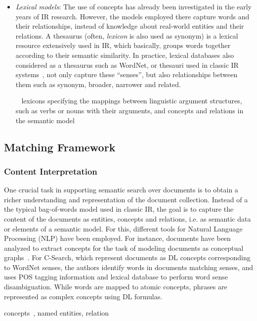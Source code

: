 \begin{itemize}
		
	\item \emph{Lexical models}: The use of concepts has already been investigated in the early years of IR research. However, the models employed there capture words and their relationships, instead of knowledge about real-world entities and their relations. A thesaurus (often, \emph{lexicon} is also used as synonym) is a lexical resource extensively used in IR, which basically, groups words together according to their semantic similarity. In practice, lexical databases also considered as a thesaurus such as WordNet, or thesauri used in classic IR systems~\cite{DBLP:conf/sigir/Giger88}, not only capture these ``senses'', but also relationships between them such as synonym, broader, narrower and related.  
	
	~\cite{DBLP:conf/sigir/Voorhees93}
	lexicons specifying the mappings between linguistic argument structures,
such as verbs or nouns with their arguments, and concepts and relations in the semantic model
\end{itemize}


\subsection{Matching Framework}


	\subsubsection{Content Interpretation} 
	One crucial task in supporting semantic search over documents is to obtain a richer understanding and representation of the document collection. Instead of a the typical bag-of-words model used in classic IR, the goal is to capture the content of the documents as entities, concepts and relations, i.e. as semantic data or elements of a semantic model. For this, different tools for Natural Language Processing (NLP) have been employed. For instance, documents have been analyzed to extract concepts for the task of modeling documents as conceptual graphs~\cite{DBLP:conf/iccs/ComparotHH07}. For C-Search, which represent documents as DL concepts corresponding to WordNet senses, the authors identify words in documents matching senses, and uses POS tagging information and lexical database to perform word sense disambiguation. While words are mapped to atomic concepts, phrases are represented as complex concepts using DL formulas.  
	
	concepts~\cite{DBLP:conf/sigir/Voorhees93}, named entities, relation \cite{DBLP:conf/cikm/Chu-CarrollP07}
	

